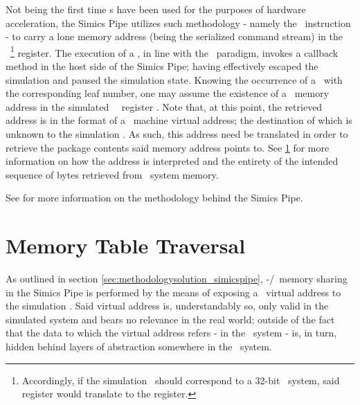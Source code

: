 Not being the first time \dvttermmagicinstruction s have been used for the purposes of hardware acceleration, the Simics Pipe utilizes such methodology - namely the  \dvttermxeightysix\ instruction - to carry a lone memory address (being the serialized command stream) in the \dvttermtarget\ \footnote{Accordingly, if the simulation \dvttermtarget\ should correspond to a 32-bit \dvttermxeightysix\ system, said register would translate to the  register.} register.
The execution of a \dvttermmagicinstruction , in line with the \dvttermmagicinstruction\ paradigm, invokes a callback method in the host side of the Simics Pipe; having effectively escaped the simulation and paused the simulation state.
Knowing the occurrence of a \dvttermmagicinstruction\ with the corresponding leaf number, one may assume the existence of a \dvttermtarget\ memory address in the simulated \dvttermtarget\ \dvttermcpu\ register .
Note that, at this point, the retrieved address is in the format of a \dvttermtarget\ machine virtual address; the destination of which is unknown to the simulation \dvttermhost .
As such, this address need be translated in order to retrieve the package contents said memory address points to.
See \ref{sec:methodologysolution_memorytabletraversal} for more information on how the address is interpreted and the entirety of the intended sequence of bytes retrieved from \dvttermhost\ system memory.

See  for more information on the methodology behind the Simics Pipe.


\section{Memory Table Traversal}
\label{sec:methodologysolution_memorytabletraversal}
As outlined in section \ref{sec:methodologysolution_simicspipe}, \dvttermtarget -/\dvttermhost\ memory sharing in the Simics Pipe is performed by the means of exposing a \dvttermtarget\ virtual address to the simulation \dvttermhost .
Said virtual address is, understandably so, only valid in the simulated system and bears no relevance in the real world; outside of the fact that the data to which the virtual address refers - in the \dvttermtarget\ system - is, in turn, hidden behind layers of abstraction somewhere in the \dvttermhost\ system.

